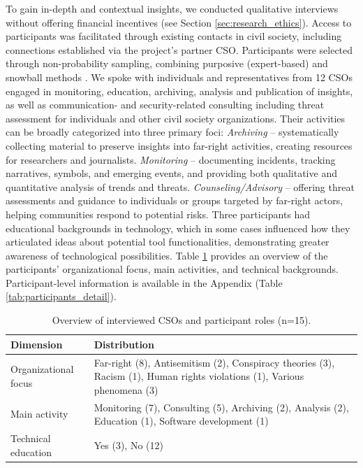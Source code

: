 \documentclass[acmsmall]{acmart}
\begin{document}
To gain in-depth and contextual insights, we conducted qualitative interviews without offering financial incentives (see Section \ref{sec:research_ethics}). Access to participants was facilitated through existing contacts in civil society, including connections established via the project's partner CSO. Participants were selected through non-probability sampling, combining purposive (expert-based) \cite{palinkas_purposeful_2015} and snowball methods \cite{etikan_2015,galloway_2005}. We spoke with individuals and representatives from 12 CSOs engaged in monitoring, education, archiving, analysis and publication of insights, as well as communication- and security-related consulting including threat assessment for individuals and other civil society organizations. Their activities can be broadly categorized into three primary foci:
\textit{Archiving} -- systematically collecting material to preserve insights into far-right activities, creating resources for researchers and journalists.
\textit{Monitoring} -- documenting incidents, tracking narratives, symbols, and emerging events, and providing both qualitative and quantitative analysis of trends and threats.
\textit{Counseling/Advisory} -- offering threat assessments and guidance to individuals or groups targeted by far-right actors, helping communities respond to potential risks.
Three participants had educational backgrounds in technology, which in some cases influenced how they articulated ideas about potential tool functionalities, demonstrating greater awareness of technological possibilities. 
Table \ref{tab:participants} provides an overview of the participants’ organizational focus, main activities, and technical backgrounds. Participant-level information is available in the Appendix (Table \ref{tab:participants_detail}).

\begin{table}[h!]
\caption{Overview of interviewed CSOs and participant roles (n=15).}
\label{tab:participants}
\centering
\small
\begin{tabular}{lp{}}
\toprule
\textbf{Dimension} & \textbf{Distribution} \\
\midrule
Organizational focus &
Far-right (8), Antisemitism (2), Conspiracy theories (3),  Racism (1), 
Human rights violations (1), Various phenomena (3) \\

Main activity &
Monitoring (7), Consulting (5), Archiving (2), Analysis (2), Education (1), Software development (1) \\

Technical education &
Yes (3), No (12) \\
\bottomrule
\end{tabular}
\end{table}
\end{document}
